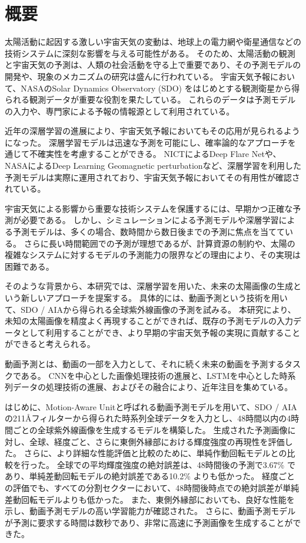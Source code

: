 \chapter*{概要}
  太陽活動に起因する激しい宇宙天気の変動は、地球上の電力網や衛星通信などの技術システムに深刻な影響を与える可能性がある。
  そのため、太陽活動の観測と宇宙天気の予測は、人類の社会活動を守る上で重要であり、その予測モデルの開発や、現象のメカニズムの研究は盛んに行われている。
  宇宙天気予報において、NASAのSolar Dynamics Observatory (SDO) をはじめとする観測衛星から得られる観測データが重要な役割を果たしている。
  これらのデータは予測モデルの入力や、専門家による予報の情報源として利用されている。
  
  近年の深層学習の進展により、宇宙天気予報においてもその応用が見られるようになった。
  深層学習モデルは迅速な予測を可能にし、確率論的なアプローチを通じて不確実性を考慮することができる。
  NICTによるDeep Flare Netや、NASAによるDeep Learning Geomagnetic perturbationなど、深層学習を利用した予測モデルは実際に運用されており、宇宙天気予報においてその有用性が確認されている。
  
  宇宙天気による影響から重要な技術システムを保護するには、早期かつ正確な予測が必要である。
  しかし、シミュレーションによる予測モデルや深層学習による予測モデルは、多くの場合、数時間から数日後までの予測に焦点を当てている。
  さらに長い時間範囲での予測が理想であるが、計算資源の制約や、太陽の複雑なシステムに対するモデルの予測能力の限界などの理由により、その実現は困難である。

  そのような背景から、本研究では、深層学習を用いた、未来の太陽画像の生成という新しいアプローチを提案する。
  具体的には、動画予測という技術を用いて、SDO / AIAから得られる全球紫外線画像の予測を試みる。
  本研究により、未知の太陽画像を精度よく再現することができれば、既存の予測モデルの入力データとして利用することができ、より早期の宇宙天気予報の実現に貢献することができると考えられる。

  動画予測とは、動画の一部を入力として、それに続く未来の動画を予測するタスクである。
  CNNを中心とした画像処理技術の進展と、LSTMを中心とした時系列データの処理技術の進展、およびその融合により、近年注目を集めている。
  
  はじめに、Motion-Aware Unitと呼ばれる動画予測モデルを用いて、SDO / AIAの211\AA フィルターから得られた時系列全球データを入力とし、48時間以内の4時間ごとの全球紫外線画像を生成するモデルを構築した。
  生成された予測画像に対し、全球、経度ごと、さらに東側外縁部における輝度強度の再現性を評価した。
  さらに、より詳細な性能評価と比較のために、単純作動回転モデルとの比較を行った。
  全球での平均輝度強度の絶対誤差は、48時間後の予測で3.67\% であり、単純差動回転モデルの絶対誤差である10.2\% よりも低かった。
  経度ごとの評価でも、すべての分割セクターにおいて、48時間後時点での絶対誤差が単純差動回転モデルよりも低かった。
  また、東側外縁部においても、良好な性能を示し、動画予測モデルの高い学習能力が確認された。
  さらに、動画予測モデルが予測に要求する時間は数秒であり、非常に高速に予測画像を生成することができた。

